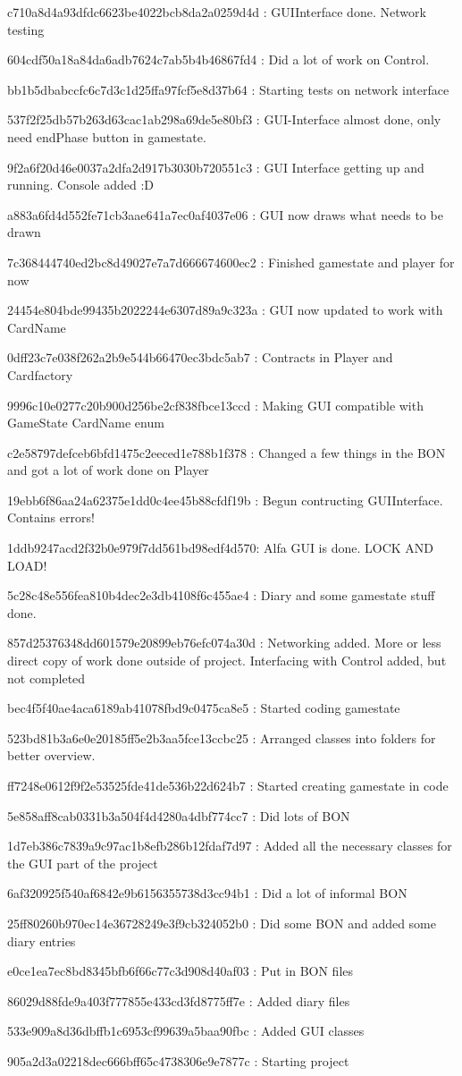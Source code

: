 c710a8d4a93dfdc6623be4022bcb8da2a0259d4d : GUIInterface done. Network testing

604cdf50a18a84da6adb7624c7ab5b4b46867fd4 : Did a lot of work on Control.

bb1b5dbabccfc6c7d3c1d25ffa97fcf5e8d37b64 : Starting tests on network interface

537f2f25db57b263d63cac1ab298a69de5e80bf3 : GUI-Interface almost done, only need endPhase button in gamestate.

9f2a6f20d46e0037a2dfa2d917b3030b720551c3 : GUI Interface getting up and running. Console added :D

a883a6fd4d552fe71cb3aae641a7ec0af4037e06 : GUI now draws what needs to be drawn

7c368444740ed2bc8d49027e7a7d666674600ec2 : Finished gamestate and player for now

24454e804bde99435b2022244e6307d89a9c323a : GUI now updated to work with CardName

0dff23c7e038f262a2b9e544b66470ec3bdc5ab7 : Contracts in Player and Cardfactory

9996c10e0277c20b900d256be2cf838fbce13ccd : Making GUI compatible with GameState CardName enum

c2e58797defceb6bfd1475c2eeced1e788b1f378 : Changed a few things in the BON and got a lot of work done on Player

19ebb6f86aa24a62375e1dd0c4ee45b88cfdf19b : Begun contructing GUIInterface. Contains errors!

1ddb9247acd2f32b0e979f7dd561bd98edf4d570: Alfa GUI is done. LOCK AND LOAD!

5c28c48e556fea810b4dec2e3db4108f6c455ae4 : Diary and some gamestate stuff done.

857d25376348dd601579e20899eb76efc074a30d : Networking added. More or less direct copy of work done outside of project. Interfacing with Control added, but not completed

bec4f5f40ae4aca6189ab41078fbd9c0475ca8e5 : Started coding gamestate

523bd81b3a6e0e20185ff5e2b3aa5fce13ccbc25 : Arranged classes into folders for better overview.

ff7248e0612f9f2e53525fde41de536b22d624b7 : Started creating gamestate in code

5e858aff8cab0331b3a504f4d4280a4dbf774cc7 : Did lots of BON

1d7eb386c7839a9c97ac1b8efb286b12fdaf7d97 : Added all the necessary classes for the GUI part of the project

6af320925f540af6842e9b6156355738d3cc94b1 : Did a lot of informal BON

25ff80260b970ec14e36728249e3f9cb324052b0 : Did some BON and added some diary entries

e0ce1ea7ec8bd8345bfb6f66c77c3d908d40af03 : Put in BON files

86029d88fde9a403f777855e433cd3fd8775ff7e : Added diary files

533e909a8d36dbffb1c6953cf99639a5baa90fbc  : Added GUI classes 

905a2d3a02218dec666bff65c4738306e9e7877c : Starting project 